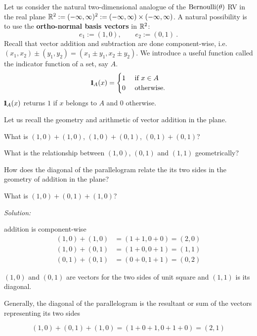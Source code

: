Let us consider the natural two-dimensional analogue of the $\mbox{{\rm Bernoulli}}(\theta)$ RV in the real plane $\mathbb{R}^2 := (-\infty,\infty)^2 := (-\infty,\infty) \times (-\infty,\infty)$.  A natural possibility is to use the {\bf ortho-normal basis vectors} in $\mathbb{R}^2$:
$$ \boxed{
e_1 := (1,0), \qquad e_2 := (0,1)
} \ .$$
Recall that vector addition and subtraction are done component-wise, i.e.~$(x_1,x_2) \pm (y_1,y_2) = (x_1 \pm y_1,x_2 \pm y_2)$.
We introduce a useful function called the indicator function of a set, say $A$.
\[
{1}\mspace{-11 mu}{1}_A(x) = 
\begin{cases}
1 & \text{ if } x \in A\\
0 & \text{ otherwise}.
\end{cases}
\]
${1}\mspace{-11 mu}{1}_A(x)$ returns $1$ if $x$ belongs to $A$ and $0$ otherwise.

\begin{example}\label{EgVectorArithmetic}
Let us recall the geometry and arithmetic of vector addition in the plane.  
\be
\item What is $(1,0)+(1,0)$, $(1,0)+(0,1)$, $(0,1)+(0,1)$?  
\item What is the relationship between $(1,0)$, $(0,1)$ and $(1,1)$ geometrically? 
\item How does the diagonal of the parallelogram relate the its two sides in the geometry of addition in the plane?  
\item What is  $(1,0)+(0,1)+(1,0)$?
\ee

{\em Solution:}\\[4pt]
\be
\item addition is component-wise
\begin{align*}
(1,0)+(1,0) &= (1+1,0+0) = (2,0)\\
(1,0)+(0,1) &= (1+0,0+1) = (1,1)\\
(0,1)+(0,1) &= (0+0,1+1)=(0,2)
\end{align*}
\item $(1,0)$ and $(0,1)$ are vectors for the two sides of unit square and $(1,1)$ is its diagonal.
\vspace{3cm}
\item Generally, the diagonal of the parallelogram is the resultant or sum of the vectors representing its two sides
\vspace{3cm}
\item
\[
(1,0)+(0,1)+(1,0)=(1+0+1,0+1+0) = (2,1)
\] 
\ee
\end{example}


